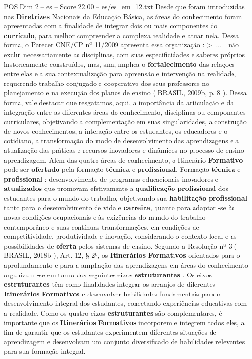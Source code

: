 \begin{textsample}{POS Dim 2 – es – Score 22.00 – es/es\_em\_12.txt}
Desde que foram introduzidas nas \textbf{Diretrizes} Nacionais da Educação Básica, as áreas do conhecimento foram apresentadas com a finalidade de integrar dois ou mais componentes do \textbf{currículo}, para melhor compreender a complexa realidade e atuar nela.
Dessa forma, o Parecer CNE/CP nº 11/2009 apresenta essa organização : > [... ] não exclui necessariamente as disciplinas, com suas especificidades e saberes próprios historicamente construídos, mas, sim, implica o \textbf{fortalecimento} das relações entre elas e a sua contextualização para apreensão e intervenção na realidade, requerendo trabalho conjugado e cooperativo dos seus professores no planejamento e na execução dos planos de ensino ( BRASIL, 2009b, p. 8 ).
Dessa forma, vale destacar que resgatamos, aqui, a importância da articulação e da integração entre as diferentes áreas do conhecimento, disciplinas ou componentes curriculares, objetivando a complementação em suas singularidades, a construção de novos conhecimentos, a interação entre os estudantes, os educadores e o cotidiano, a transformação do modo de desenvolvimento das aprendizagens e a atualização das práticas e recursos inovadores e dinâmicos no processo de ensino-aprendizagem.
Além das quatro áreas de conhecimento, o Itinerário \textbf{Formativo} pode ser \textbf{ofertado} pela formação \textbf{técnica} e \textbf{profissional}.
Formação \textbf{técnica} e \textbf{profissional} : desenvolvimento de programas educacionais inovadores e \textbf{atualizados} que promovam efetivamente a \textbf{qualificação} \textbf{profissional} dos estudantes para o mundo do trabalho, objetivando sua \textbf{habilitação} \textbf{profissional} tanto para o desenvolvimento de vida e \textbf{carreira}, quanto para adaptar -se às novas condições ocupacionais e às exigências do mundo do trabalho contemporâneo e suas contínuas transformações, em condições de competitividade, produtividade e inovação, considerando o contexto local e as possibilidades de \textbf{oferta} pelos sistemas de ensino.
Segundo a Resolução nº 3 ( BRASIL, 2018b ), Art. 12, § 2º, os \textbf{Itinerários} \textbf{Formativos} orientados para o aprofundamento e para a ampliação das aprendizagens em áreas do conhecimento organizam -se em torno dos seguintes eixos \textbf{estruturantes} : Os eixos \textbf{estruturantes} têm como finalidades integrar os arranjos de diferentes \textbf{Itinerários} \textbf{Formativos} e desenvolver habilidades fundamentais para o desenvolvimento integral dos estudantes, conectando experiências educativas com a realidade.
Como os quatro eixos \textbf{estruturantes} são complementares, é importante que os \textbf{Itinerários} \textbf{Formativos} incorporem e integrem todos eles, a fim de garantir que os estudantes experimentem diferentes situações de aprendizagem e desenvolvam um conjunto diversificado de habilidades relevantes para sua formação integral.

\end{textsample}
